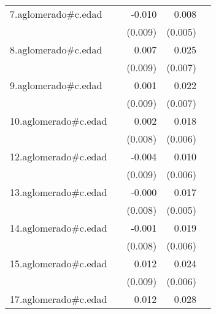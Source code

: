 {\begin{longtable}{l*{4}{D{.}{.}{-1}}}
\addlinespace
7.aglomerado#c.edad&                     &      -0.010         &       0.008         &                     \\
            &                     &     (0.009)         &     (0.005)         &                     \\
\addlinespace
8.aglomerado#c.edad&                     &       0.007         &       0.025\sym{***}&                     \\
            &                     &     (0.009)         &     (0.007)         &                     \\
\addlinespace
9.aglomerado#c.edad&                     &       0.001         &       0.022\sym{***}&                     \\
            &                     &     (0.009)         &     (0.007)         &                     \\
\addlinespace
10.aglomerado#c.edad&                     &       0.002         &       0.018\sym{**} &                     \\
            &                     &     (0.008)         &     (0.006)         &                     \\
\addlinespace
12.aglomerado#c.edad&                     &      -0.004         &       0.010         &                     \\
            &                     &     (0.009)         &     (0.006)         &                     \\
\addlinespace
13.aglomerado#c.edad&                     &      -0.000         &       0.017\sym{***}&                     \\
            &                     &     (0.008)         &     (0.005)         &                     \\
\addlinespace
14.aglomerado#c.edad&                     &      -0.001         &       0.019\sym{***}&                     \\
            &                     &     (0.008)         &     (0.006)         &                     \\
\addlinespace
15.aglomerado#c.edad&                     &       0.012         &       0.024\sym{***}&                     \\
            &                     &     (0.009)         &     (0.006)         &                     \\
\addlinespace
17.aglomerado#c.edad&                     &       0.012         &       0.028\sym{***}&                     \\

\end{longtable}}
